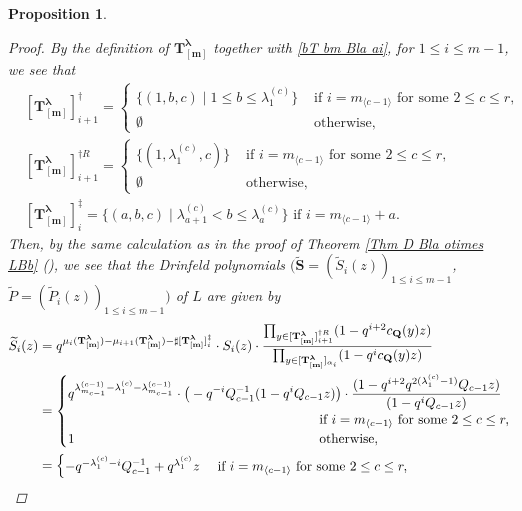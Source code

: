 \documentclass[12pt]{amsart}
\newtheorem{prop}[thm]{Proposition}
\numberwithin{equation}{thm}
\newcommand\bQ{\mathbf Q}
\newcommand\bS{\mathbf S}
\newcommand\bT{\mathbf T}
\renewcommand\bm{\mathbf m} %
\renewcommand\a{\alpha}  %
\newcommand\la{\lambda}
\newcommand\Bla{\boldsymbol\lambda}
\newcommand{\dis}{\displaystyle}
\newcommand\wt{\widetilde}
\newcommand\lan{\langle}
\newcommand\ran{\rangle}
\newcounter{ni}
\newcounter{roku}
\newcommand{\rovi}{\roman{roku}}
\begin{document}
\begin{prop}
\begin{proof}
By the definition of $\bT_{[\bm]}^{\Bla}$ together with \eqref{bT bm Bla ai}, for $1 \leq i \leq m-1$, we see that 
\begin{align*}
&[\bT_{[\bm]}^{\Bla}]_{i+1}^{\dag}  
	= \begin{cases} 
	\{  (1,b,c) \mid 1 \leq b \leq \la^{(c)}_1 \} & \text{ if }  i=m_{\lan c-1 \ran} \text{ for some } 2 \leq c \leq r, 
	\\
	\emptyset & \text{ otherwise}, 
	\end{cases}
\\
& [\bT_{[\bm]}^{\Bla}]_{i+1}^{\dag R} 
	= \begin{cases} 
	\{  (1,\la_1^{(c)}, c)  \} & \text{ if }  i=m_{\lan c-1 \ran} \text{ for some } 2 \leq c \leq r, 
	\\
	\emptyset & \text{ otherwise}, 
	\end{cases}
\\
& [\bT_{[\bm]}^{\Bla}]_i^{\ddag} 
	= \{ (a,b,c) \mid \la_{a+1}^{(c)} < b \leq \la_a^{(c)} \} 
		\text{ if } i = m_{\lan c-1 \ran} +a.
\end{align*}
Then, by the same calculation as in the proof of Theorem \ref{Thm D Bla otimes LBb} (\rovi), 
we see that the Drinfeld polynomials $(\wt{\bS} =(\wt{S}_i(z))_{1 \leq i \leq m-1}$, $\wt{P}=(\wt{P}_i(z))_{1 \leq i \leq m-1}) $ 
of $L$ are given by 
\begin{align*}
\wt{S}_i(z) 
	&= q^{\mu_i(\bT_{[\bm]}^{\Bla}) - \mu_{i+1} (\bT_{[\bm]}^{\Bla}) - \sharp [\bT_{[\bm]}^{\Bla}]_i^{\ddag}}
		\cdot S_i(z) \cdot \frac{ \prod_{y \in [\bT_{[\bm]}^{\Bla}]_{i+1}^{\dag R}} (1 - q^{i+2} c_{\bQ}(y) z)}
						{ \prod_{ y \in [\bT_{[\bm]}^{\Bla}]_{\a_i}} (1 - q^i c_{\bQ} (y) z)}
	\\
	&= \begin{cases}
		\dis q^{\la^{(c-1)}_{m_{c-1}} - \la_1^{(c)} - \la^{(c-1)}_{m_{c-1}}} 
			\cdot \big(  - q^{-i} Q_{c-1}^{-1} (1 - q^i Q_{c-1} z) \big) 
			\cdot \frac{ (1 - q^{i+2} q^{2 (\la_1^{(c)} -1)} Q_{c-1} z)}{ (1 - q^i Q_{c-1} z)}  
			\hspace{-15em} 
			\\
			& \text{ if } i = m_{\lan c-1 \ran} \text{ for some } 2 \leq c \leq r, 
		\\ 
		1 & \text{ otherwise}, 
	\end{cases}
	\\
	&= \begin{cases}
		- q^{- \la_1^{(c)} -i} Q_{c-1}^{-1} + q^{\la_1^{(c)} }  z 
			& \text{ if } i = m_{\lan c-1 \ran} \text{ for some } 2 \leq c \leq r, 
		\\ 

\end{cases}
\end{align*}
\end{proof}
\end{prop}
\end{document}

